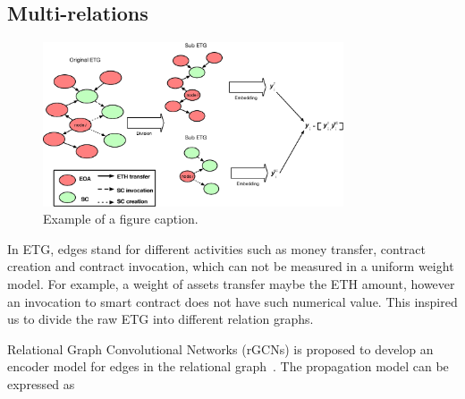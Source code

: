\subsection{Multi-relations}

\begin{figure}[htbp]
	\centering
	\label{fig_graph_split}
	\includegraphics[width=3.5in]{fig/graph_split.eps}
	\caption{Example of a figure caption.}
\end{figure}

In ETG, edges stand for different activities such as money transfer, contract creation and contract invocation, which can not be measured in a uniform weight model. For example, a weight of assets transfer maybe the ETH amount, however an invocation to smart contract does not have such numerical value. This inspired us to divide the raw ETG into different relation graphs.






Relational Graph Convolutional Networks (rGCNs) is proposed to develop an encoder model for edges in the relational graph~\cite{schlichtkrull2018modeling}. The propagation model can be expressed as

